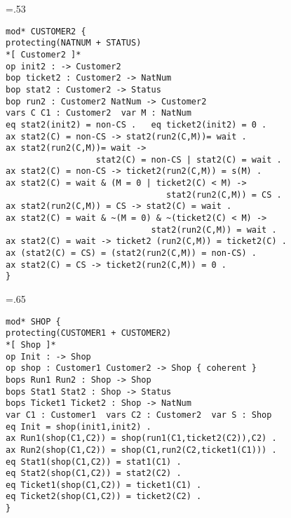 \documentclass[landscape]{slides}
\begin{document}
\begin{slide}\large\parskip=0pt\baselineskip=.53\baselineskip
\vspace*{-2cm}
\begin{verbatim}
mod* CUSTOMER2 {
protecting(NATNUM + STATUS)
*[ Customer2 ]*
op init2 : -> Customer2
bop ticket2 : Customer2 -> NatNum
bop stat2 : Customer2 -> Status
bop run2 : Customer2 NatNum -> Customer2
vars C C1 : Customer2  var M : NatNum
eq stat2(init2) = non-CS .   eq ticket2(init2) = 0 .
ax stat2(C) = non-CS -> stat2(run2(C,M))= wait .
ax stat2(run2(C,M))= wait ->
                  stat2(C) = non-CS | stat2(C) = wait .
ax stat2(C) = non-CS -> ticket2(run2(C,M)) = s(M) .
ax stat2(C) = wait & (M = 0 | ticket2(C) < M) ->
                                stat2(run2(C,M)) = CS .
ax stat2(run2(C,M)) = CS -> stat2(C) = wait .
ax stat2(C) = wait & ~(M = 0) & ~(ticket2(C) < M) ->
                             stat2(run2(C,M)) = wait .
ax stat2(C) = wait -> ticket2 (run2(C,M)) = ticket2(C) .
ax (stat2(C) = CS) = (stat2(run2(C,M)) = non-CS) .
ax stat2(C) = CS -> ticket2(run2(C,M)) = 0 .
}
\end{verbatim}
\end{slide}

\begin{slide}\large\parskip=0pt\baselineskip=.65\baselineskip
\vspace*{-1.5cm}
\begin{verbatim}
mod* SHOP {
protecting(CUSTOMER1 + CUSTOMER2)
*[ Shop ]*
op Init : -> Shop
op shop : Customer1 Customer2 -> Shop { coherent }
bops Run1 Run2 : Shop -> Shop
bops Stat1 Stat2 : Shop -> Status
bops Ticket1 Ticket2 : Shop -> NatNum
var C1 : Customer1  vars C2 : Customer2  var S : Shop
eq Init = shop(init1,init2) .
ax Run1(shop(C1,C2)) = shop(run1(C1,ticket2(C2)),C2) .
ax Run2(shop(C1,C2)) = shop(C1,run2(C2,ticket1(C1))) .
eq Stat1(shop(C1,C2)) = stat1(C1) .
eq Stat2(shop(C1,C2)) = stat2(C2) .
eq Ticket1(shop(C1,C2)) = ticket1(C1) .
eq Ticket2(shop(C1,C2)) = ticket2(C2) .
}
\end{verbatim}
\end{slide}
\end{document}
